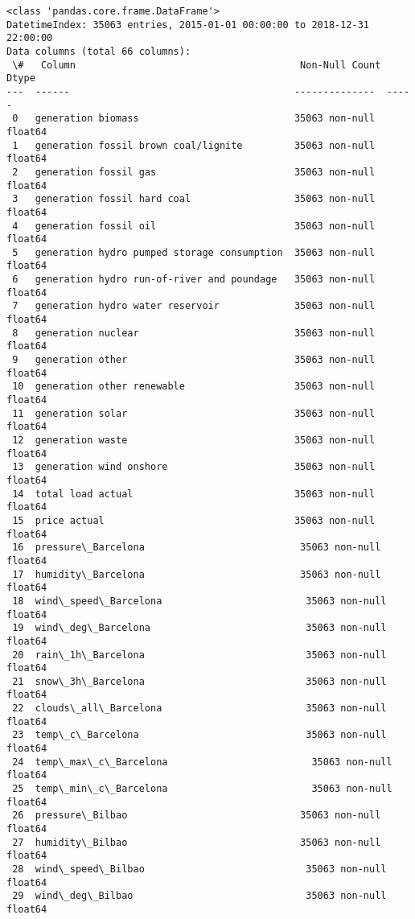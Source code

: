 \documentclass[11pt]{article}
\begin{document}
    \begin{Verbatim}[commandchars=\\\{\}]
<class 'pandas.core.frame.DataFrame'>
DatetimeIndex: 35063 entries, 2015-01-01 00:00:00 to 2018-12-31 22:00:00
Data columns (total 66 columns):
 \#   Column                                       Non-Null Count  Dtype
---  ------                                       --------------  -----
 0   generation biomass                           35063 non-null  float64
 1   generation fossil brown coal/lignite         35063 non-null  float64
 2   generation fossil gas                        35063 non-null  float64
 3   generation fossil hard coal                  35063 non-null  float64
 4   generation fossil oil                        35063 non-null  float64
 5   generation hydro pumped storage consumption  35063 non-null  float64
 6   generation hydro run-of-river and poundage   35063 non-null  float64
 7   generation hydro water reservoir             35063 non-null  float64
 8   generation nuclear                           35063 non-null  float64
 9   generation other                             35063 non-null  float64
 10  generation other renewable                   35063 non-null  float64
 11  generation solar                             35063 non-null  float64
 12  generation waste                             35063 non-null  float64
 13  generation wind onshore                      35063 non-null  float64
 14  total load actual                            35063 non-null  float64
 15  price actual                                 35063 non-null  float64
 16  pressure\_Barcelona                           35063 non-null  float64
 17  humidity\_Barcelona                           35063 non-null  float64
 18  wind\_speed\_Barcelona                         35063 non-null  float64
 19  wind\_deg\_Barcelona                           35063 non-null  float64
 20  rain\_1h\_Barcelona                            35063 non-null  float64
 21  snow\_3h\_Barcelona                            35063 non-null  float64
 22  clouds\_all\_Barcelona                         35063 non-null  float64
 23  temp\_c\_Barcelona                             35063 non-null  float64
 24  temp\_max\_c\_Barcelona                         35063 non-null  float64
 25  temp\_min\_c\_Barcelona                         35063 non-null  float64
 26  pressure\_Bilbao                              35063 non-null  float64
 27  humidity\_Bilbao                              35063 non-null  float64
 28  wind\_speed\_Bilbao                            35063 non-null  float64
 29  wind\_deg\_Bilbao                              35063 non-null  float64

\end{Verbatim}
\end{document}
